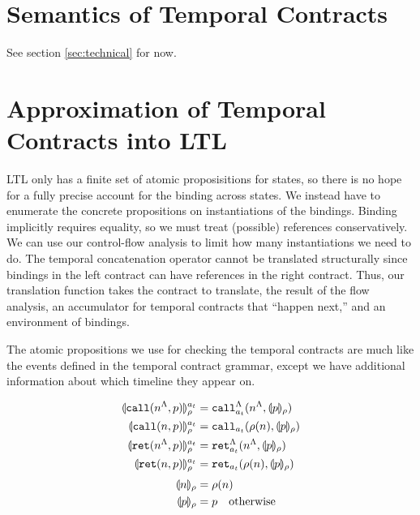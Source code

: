 \documentclass[preprint,onecolumn,9pt]{sigplanconf} %
\begin{document}
\section{Semantics of Temporal Contracts}

See section \ref{sec:technical} for now.

\section{Approximation of Temporal Contracts into LTL}

LTL only has a finite set of atomic proposisitions for states, so there is no hope for a fully precise account for the binding across states.
%
We instead have to enumerate the concrete propositions on instantiations of the bindings.
%
Binding implicitly requires equality, so we must treat (possible) references conservatively.
%
We can use our control-flow analysis to limit how many instantiations we need to do.
%
The temporal concatenation operator cannot be translated structurally since bindings in the left contract can have references in the right contract.
%
Thus, our translation function takes the contract to translate, the result of the flow analysis, an accumulator for temporal contracts that ``happen next,'' and an environment of bindings.

The atomic propositions we use for checking the temporal contracts are much like the events defined in the temporal contract grammar, except we have additional information about which timeline they appear on.

\begin{align*}
  \llparenthesis {\tt call}(n^\Lambda, p) \rrparenthesis_{\rho}^{a_t} &=
    {\tt call}_{a_t}^{\Lambda}(n^\Lambda,\llparenthesis p \rrparenthesis_{\rho})
\\
  \llparenthesis {\tt call}(n, p) \rrparenthesis_{\rho}^{a_t} &=
    {\tt call}_{a_t}(\rho(n),\llparenthesis p \rrparenthesis_{\rho})
\\
  \llparenthesis {\tt ret}(n^\Lambda, p) \rrparenthesis_{\rho}^{a_t} &=
    {\tt ret}_{a_t}^{\Lambda}(n^\Lambda,\llparenthesis p \rrparenthesis_{\rho})
\\
  \llparenthesis {\tt ret}(n, p) \rrparenthesis_{\rho}^{a_t} &=
    {\tt ret}_{a_t}(\rho(n),\llparenthesis p \rrparenthesis_{\rho})
\\[2pt]
  \llparenthesis n \rrparenthesis_{\rho} &= \rho(n)
\\
  \llparenthesis p \rrparenthesis_{\rho} &= p \quad\text{otherwise}
\end{align*}
\end{document}
